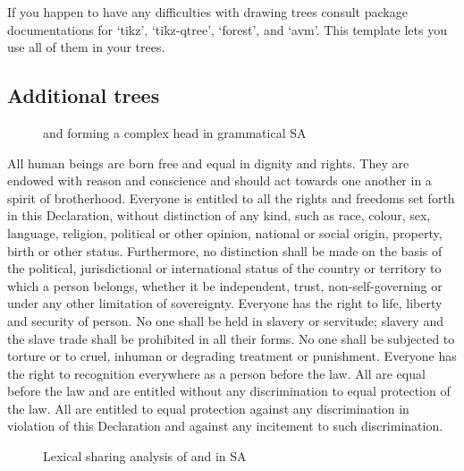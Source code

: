 If you happen to have any difficulties with drawing trees consult package documentations for `tikz', `tikz-qtree', `forest', and `avm'. This template lets you use all of them in your trees.

\subsection{Additional trees}

\begin{figure}[hbt!]
    \centering
    \caption{{\Pl} and {\Poss} forming a complex head in grammatical SA}
    \label{fig:furkan2}
\end{figure}

All human beings are born free and equal in dignity and rights. They are endowed with reason and conscience and should act towards one another in a spirit of brotherhood. Everyone is entitled to all the rights and freedoms set forth in this Declaration, without distinction of any kind, such as race, colour, sex, language, religion, political or other opinion, national or social origin, property, birth or other status. Furthermore, no distinction shall be made on the basis of the political, jurisdictional or international status of the country or territory to which a person belongs, whether it be independent, trust, non-self-governing or under any other limitation of sovereignty. Everyone has the right to life, liberty and security of person. No one shall be held in slavery or servitude; slavery and the slave trade shall be prohibited in all their forms. No one shall be subjected to torture or to cruel, inhuman or degrading treatment or punishment. Everyone has the right to recognition everywhere as a person before the law. All are equal before the law and are entitled without any discrimination to equal protection of the law. All are entitled to equal protection against any discrimination in violation of this Declaration and against any incitement to such discrimination.
\begin{figure}[hbt!]
    \centering
{}
    \caption{Lexical sharing analysis of {\Pl} and {\Poss} in SA}
    \label{fig:lexicalshare}
\end{figure}

